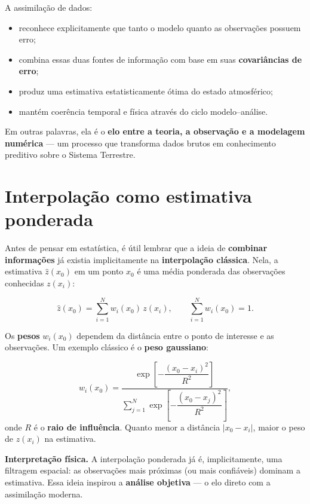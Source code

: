 \begin{sintese}
A assimilação de dados:
\begin{itemize}
    \item reconhece explicitamente que tanto o modelo quanto as observações possuem erro;
    \item combina essas duas fontes de informação com base em suas \textbf{covariâncias de erro};
    \item produz uma estimativa estatisticamente ótima do estado atmosférico;
    \item mantém coerência temporal e física através do ciclo modelo--análise.
\end{itemize}
Em outras palavras, ela é o \textbf{elo entre a teoria, a observação e a modelagem numérica} --- um processo que transforma dados brutos em conhecimento preditivo sobre o Sistema Terrestre.
\end{sintese}


\section{Interpolação como estimativa ponderada}

Antes de pensar em estatística, é útil lembrar que a ideia de \textbf{combinar informações} já existia implicitamente na \textbf{interpolação clássica}.  
Nela, a estimativa \( \hat{z}(x_0) \) em um ponto \( x_0 \) é uma média ponderada das observações conhecidas \( z(x_i) \):

\begin{equation}
\hat{z}(x_0) = \sum_{i=1}^{N} w_i(x_0)\, z(x_i),
\qquad 
\sum_{i=1}^{N} w_i(x_0) = 1.
\label{eq:interp}
\end{equation}

Os \textbf{pesos} \( w_i(x_0) \) dependem da distância entre o ponto de interesse e as observações.  
Um exemplo clássico é o \textbf{peso gaussiano}:

\begin{equation}
w_i(x_0)
= 
\dfrac{
\exp\!\left[-\dfrac{(x_0 - x_i)^2}{R^2}\right]
}{
\sum_{j=1}^{N} 
\exp\!\left[-\dfrac{(x_0 - x_j)^2}{R^2}\right]
},
\label{eq:gaussian_weight}
\end{equation}
onde \( R \) é o \textbf{raio de influência}.  
Quanto menor a distância \(|x_0 - x_i|\), maior o peso de \(z(x_i)\) na estimativa.

\medskip
\noindent
\textbf{Interpretação física.}  
A interpolação ponderada já é, implicitamente, uma filtragem espacial: as observações mais próximas (ou mais confiáveis) dominam a estimativa.  
Essa ideia inspirou a \textbf{análise objetiva} \citep{Cressman1959,Barnes1964} --- o elo direto com a assimilação moderna.

